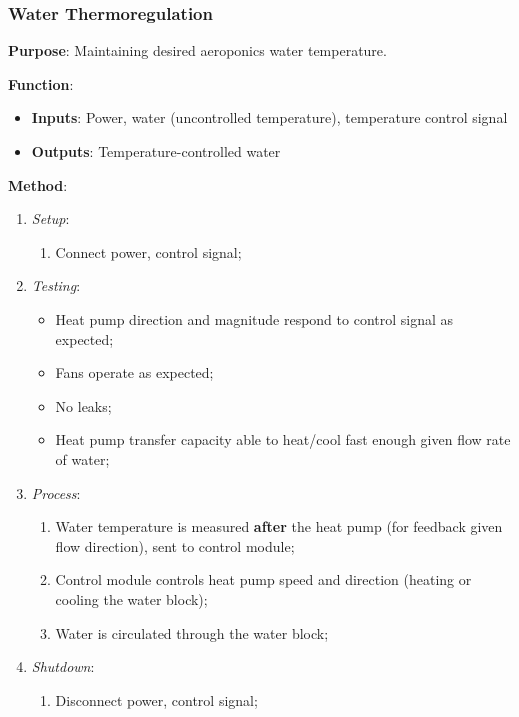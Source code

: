 \subsubsection{Water Thermoregulation}
\label{sec:watertemp}

\textbf{Purpose}: Maintaining desired aeroponics water temperature.

\textbf{Function}: 
\begin{itemize}
    \item \textbf{Inputs}: Power, water (uncontrolled temperature), temperature control signal
    \item \textbf{Outputs}: Temperature-controlled water
\end{itemize}

\textbf{Method}:
\begin{enumerate}
    \item \textit{Setup}:
    \begin{enumerate}
        \item Connect power, control signal;
    \end{enumerate}
    \item \textit{Testing}:
    \begin{itemize}
        \item Heat pump direction and magnitude respond to control signal as expected;
        \item Fans operate as expected;
        \item No leaks;
        \item Heat pump transfer capacity able to heat/cool fast enough given flow rate of water;
    \end{itemize}
    \item \textit{Process}:
    \begin{enumerate}
        \item Water temperature is measured \textbf{after} the heat pump (for feedback given flow direction), sent to control module;
        \item Control module controls heat pump speed and direction (heating or cooling the water block);
        \item Water is circulated through the water block;
    \end{enumerate}
    \item \textit{Shutdown}:
    \begin{enumerate}
        \item Disconnect power, control signal;
    \end{enumerate}
\end{enumerate}

